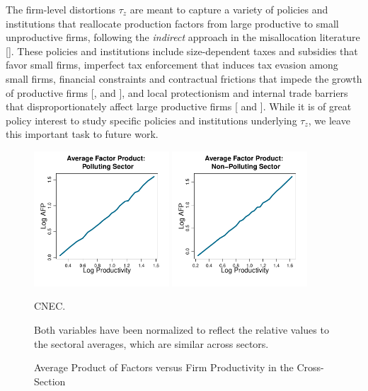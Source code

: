 \documentclass[AEJ]{AEA}
\begin{document}
The firm-level distortions $\tau_z$ are meant to capture a variety of policies and institutions that reallocate production factors from large productive to small unproductive firms, following the \emph{indirect} approach in the misallocation literature [\citet{RestucciaRogerson:2013}]. These policies and institutions include size-dependent taxes and subsidies that favor small firms, imperfect tax enforcement that induces tax evasion among small firms, financial constraints and contractual frictions that impede the growth of productive firms [\citet{CooleyQuadrini:2001}, \citet{ClementiHopenhayn:2006} and \citet{Akcigitetal:2018}], and local protectionism and internal trade barriers that disproportionately affect large productive firms [\citet{Eberhardtetal:2016} and \citet{TombeZhu:2015}]. While it is of great policy interest to study specific policies and institutions underlying $\tau_z$, we leave this important task to future work.

\begin{figure}[t]
    \begin{center}
    \includegraphics[width=0.45\textwidth]{./Figures/apf_pol_weight.pdf}
    \includegraphics[width=0.45\textwidth]{./Figures/apf_npol_weight.pdf}
    \caption{Average Product of Factors versus Firm Productivity in the Cross-Section}
    \begin{figurenotes}[Source]
        CNEC.
    \end{figurenotes}
    \begin{figurenotes}
        Both variables have been normalized to reflect the relative values to the sectoral averages, which are similar across sectors.
    \end{figurenotes}
    \label{fig:apf}
    \end{center}
\end{figure}
\end{document}
